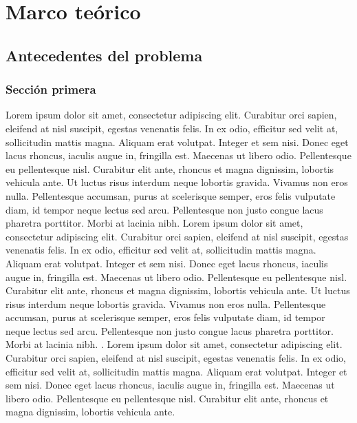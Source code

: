 \chapter{Marco teórico}

\section{Antecedentes del problema}

\subsection {Sección primera}

Lorem ipsum dolor sit amet, consectetur adipiscing elit. Curabitur orci sapien, eleifend at nisl suscipit, egestas venenatis felis. In ex odio, efficitur sed velit at, sollicitudin mattis magna. Aliquam erat volutpat. Integer et sem nisi. Donec eget lacus rhoncus, iaculis augue in, fringilla est. Maecenas ut libero odio. Pellentesque eu pellentesque nisl. Curabitur elit ante, rhoncus et magna dignissim, lobortis vehicula ante. Ut luctus risus interdum neque lobortis gravida. Vivamus non eros nulla. Pellentesque accumsan, purus at scelerisque semper, eros felis vulputate diam, id tempor neque lectus sed arcu. Pellentesque non justo congue lacus pharetra porttitor. Morbi at lacinia nibh. \citep{GRADE1990} Lorem ipsum dolor sit amet, consectetur adipiscing elit. Curabitur orci sapien, eleifend at nisl suscipit, egestas venenatis felis. In ex odio, efficitur sed velit at, sollicitudin mattis magna. Aliquam erat volutpat. Integer et sem nisi. Donec eget lacus rhoncus, iaculis augue in, fringilla est. Maecenas ut libero odio. Pellentesque eu pellentesque nisl. Curabitur elit ante, rhoncus et magna dignissim, lobortis vehicula ante. Ut luctus risus interdum neque lobortis gravida. Vivamus non eros nulla. Pellentesque accumsan, purus at scelerisque semper, eros felis vulputate diam, id tempor neque lectus sed arcu. Pellentesque non justo congue lacus pharetra porttitor. Morbi at lacinia nibh. \citep{GonzalesdeOlarte1990}. Lorem ipsum dolor sit amet, consectetur adipiscing elit. Curabitur orci sapien, eleifend at nisl suscipit, egestas venenatis felis. In ex odio, efficitur sed velit at, sollicitudin mattis magna. Aliquam erat volutpat. Integer et sem nisi. Donec eget lacus rhoncus, iaculis augue in, fringilla est. Maecenas ut libero odio. Pellentesque eu pellentesque nisl. Curabitur elit ante, rhoncus et magna dignissim, lobortis vehicula ante.



